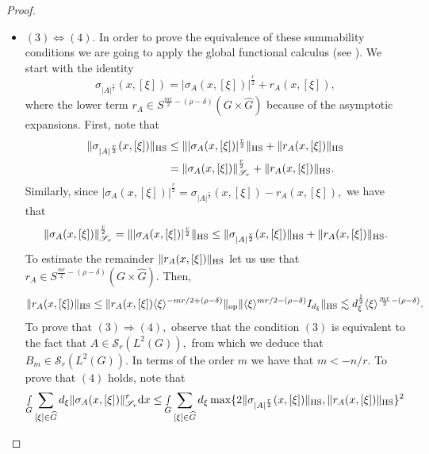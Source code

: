 \documentclass[12pt, reqno]{amsart}
\theoremstyle{definition}
\theoremstyle{remark}
\numberwithin{equation}{section}
\begin{document}
\begin{proof}
\begin{itemize}
\item $(3)\Longleftrightarrow(4).$ In order to prove the equivalence of these summability conditions we are going to apply the global functional calculus (see \cite{RuzhanskyWirth2014}). We start with the identity
\begin{equation}
    \sigma_{|A|^{\frac{r}{2}}}(x,[\xi])=|\sigma_A(x,[\xi])|^{\frac{r}{2}}+r_{A}(x,[\xi]),
\end{equation}where the lower term $r_{A}\in S^{\frac{mr}{2}-(\rho-\delta)}(G\times \widehat{G})$ because of the asymptotic expansions. First, note that
\begin{align*}
    \Vert\sigma_{|A|^{\frac{r}{2}}}(x,[\xi])\Vert_{\textnormal{HS}} &\leq  \Vert  |\sigma_A(x,[\xi])|^{\frac{r}{2}} \Vert_{\textnormal{HS}}+ \Vert r_{A}(x,[\xi])\Vert_{\textnormal{HS}}\\
    &=\Vert  \sigma_A(x,[\xi]) \Vert_{\mathscr{S}_r}^{\frac{r}{2}}+ \Vert r_{A}(x,[\xi])\Vert_{\textnormal{HS}}.
\end{align*}Similarly, since $|\sigma_A(x,[\xi])|^{\frac{r}{2}}=\sigma_{|A|^{\frac{r}{2}}}(x,[\xi])-r_{A}(x,[\xi]),$ we have that 
        \begin{align*}
           \Vert  \sigma_A(x,[\xi]) \Vert_{\mathscr{S}_r}^{\frac{r}{2}}= \Vert  |\sigma_A(x,[\xi])|^{\frac{r}{2}} \Vert_{\textnormal{HS}}\leq \Vert\sigma_{|A|^{\frac{r}{2}}}(x,[\xi])\Vert_{\textnormal{HS}} + \Vert r_{A}(x,[\xi])\Vert_{\textnormal{HS}}.
        \end{align*}
        To estimate the remainder $\Vert r_{A}(x,[\xi])\Vert_{\textnormal{HS}}$ let us use that $r_A\in S^{ \frac{mr}{2}-(\rho-\delta)}(G\times \widehat{G}). $ Then,
   \begin{equation}
      \Vert r_{A}(x,[\xi]) \Vert_{\textnormal{HS}}\leq \Vert r_{A}(x,[\xi])\langle\xi\rangle^{-mr/2+(\rho-\delta)}\Vert_{\textnormal{op}}\Vert \langle\xi\rangle^{mr/2-(\rho-\delta)}I_{d_\xi} \Vert_{\textnormal{HS}} \lesssim d_{\xi}^{\frac{1}{2}}\langle\xi\rangle^{\frac{mr}{2}-(\rho-\delta)}.
   \end{equation} To prove that $(3)\Longrightarrow(4),$ observe that the condition $(3)$ is equivalent to the fact that $A\in \mathscr{S}_{r}(L^2(G)),$ from which we deduce that $B_{m}\in \mathscr{S}_{r}(L^2(G)).$ In terms of the order $m$ we have that $m<-n/r.$ To prove that $(4)$ holds, note that
   \begin{align*}
      \smallint\limits_G\sum_{[\xi]\in \widehat{G}}d_\xi \Vert  \sigma_A(x,[\xi]) \Vert_{\mathscr{S}_r}^{r}\textnormal{d}x &\leq  \smallint\limits_G\sum_{[\xi]\in \widehat{G}}d_\xi \max\{ 2\Vert\sigma_{|A|^{\frac{r}{2}}}(x,[\xi])\Vert_{\textnormal{HS}}, \Vert r_{A}(x,[\xi])\Vert_{\textnormal{HS}}\}^2\\

\end{align*}
\end{itemize}
\end{proof}
\end{document}
